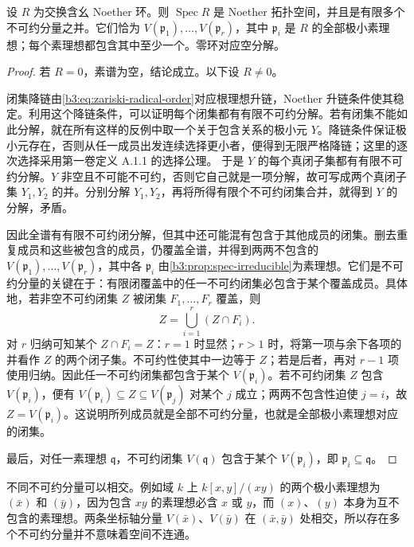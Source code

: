 \begin{proposition}\label{b3:prop:noether-spectrum-components}
	设 \(R\) 为交换含幺 Noether 环。则 \(\operatorname{Spec}R\) 是 Noether 拓扑空间，并且是有限多个不可约分量之并。它们恰为 \(V(\mathfrak p_1),\ldots,V(\mathfrak p_r)\)，其中 \(\mathfrak p_i\) 是 \(R\) 的全部极小素理想；每个素理想都包含其中至少一个。零环对应空分解。
\end{proposition}
\begin{proof}
	若 \(R=0\)，素谱为空，结论成立。以下设 \(R\ne0\)。

	闭集降链由\eqref{b3:eq:zariski-radical-order}对应根理想升链，Noether 升链条件使其稳定。利用这个降链条件，可以证明每个闭集都有有限不可约分解。若有闭集不能如此分解，就在所有这样的反例中取一个关于包含关系的极小元 \(Y\)。降链条件保证极小元存在，否则从任一成员出发连续选择更小者，便得到无限严格降链；这里的逐次选择采用第一卷定义 A.1.1 的选择公理。 于是 \(Y\) 的每个真闭子集都有有限不可约分解。\(Y\) 非空且不可能不可约，否则它自己就是一项分解，故可写成两个真闭子集 \(Y_1,Y_2\) 的并。分别分解 \(Y_1,Y_2\)，再将所得有限个不可约闭集合并，就得到 \(Y\) 的分解，矛盾。

	因此全谱有有限不可约闭分解，但其中还可能混有包含于其他成员的闭集。删去重复成员和这些被包含的成员，仍覆盖全谱，并得到两两不包含的 \(V(\mathfrak p_1),\ldots,V(\mathfrak p_r)\)，其中各 \(\mathfrak p_i\) 由\cref{b3:prop:spec-irreducible}为素理想。它们是不可约分量的关键在于：有限闭覆盖中的任一不可约闭集必包含于某个覆盖成员。具体地，若非空不可约闭集 \(Z\) 被闭集 \(F_1,\ldots,F_r\) 覆盖，则
	\[
		Z=\bigcup_{i=1}^r(Z\cap F_i).
	\]
	对 \(r\) 归纳可知某个 \(Z\cap F_i=Z\)：\(r=1\) 时显然；\(r>1\) 时，将第一项与余下各项的并看作 \(Z\) 的两个闭子集。不可约性使其中一边等于 \(Z\)；若是后者，再对 \(r-1\) 项使用归纳。因此任一不可约闭集都包含于某个 \(V(\mathfrak p_i)\)。若不可约闭集 \(Z\) 包含 \(V(\mathfrak p_i)\)，便有 \(V(\mathfrak p_i)\subseteq Z\subseteq V(\mathfrak p_j)\) 对某个 \(j\) 成立；两两不包含性迫使 \(j=i\)，故 \(Z=V(\mathfrak p_i)\)。这说明所列成员就是全部不可约分量，也就是全部极小素理想对应的闭集。

	最后，对任一素理想 \(\mathfrak q\)，不可约闭集 \(V(\mathfrak q)\) 包含于某个 \(V(\mathfrak p_i)\)，即 \(\mathfrak p_i\subseteq\mathfrak q\)。
\end{proof}

不同不可约分量可以相交。例如域 \(k\) 上 \(k[x,y]/(xy)\) 的两个极小素理想为 \((\bar x)\) 和 \((\bar y)\)，因为包含 \(xy\) 的素理想必含 \(x\) 或 \(y\)，而 \((x)\)、\((y)\) 本身为互不包含的素理想。两条坐标轴分量 \(V(\bar x)\)、\(V(\bar y)\) 在 \((\bar x,\bar y)\) 处相交，所以存在多个不可约分量并不意味着空间不连通。
